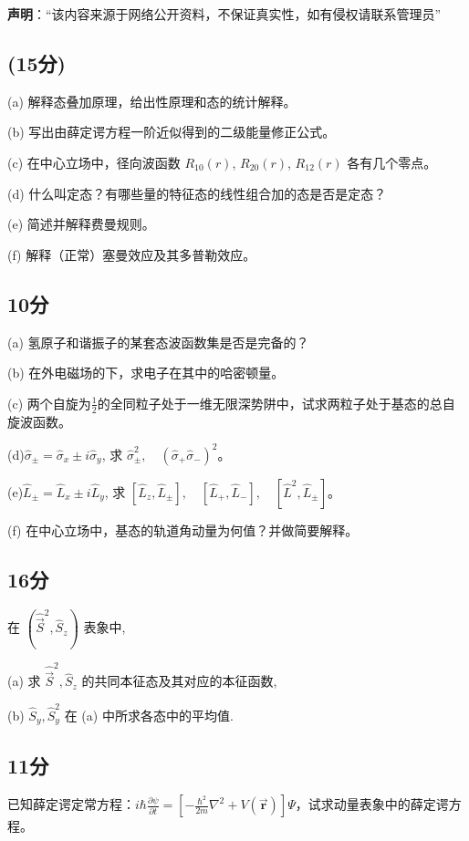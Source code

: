 
\textbf{声明}：“该内容来源于网络公开资料，不保证真实性，如有侵权请联系管理员”



\subsection{(15分)}

(a) 解释态叠加原理，给出性原理和态的统计解释。

(b) 写出由薛定谔方程一阶近似得到的二级能量修正公式。

(c) 在中心立场中，径向波函数 $R_{10}(r)$, $R_{20}(r)$, $R_{12}(r)$ 各有几个零点。

(d) 什么叫定态？有哪些量的特征态的线性组合加的态是否是定态？

(e) 简述并解释费曼规则。

(f) 解释（正常）塞曼效应及其多普勒效应。

\subsection{10分}

(a) 氢原子和谐振子的某套态波函数集是否是完备的？

(b) 在外电磁场的下，求电子在其中的哈密顿量。

(c) 两个自旋为$\frac{1}{2}$的全同粒子处于一维无限深势阱中，试求两粒子处于基态的总自旋波函数。

(d)$\hat{\sigma}_{\pm} = \hat{\sigma}_x \pm i \hat{\sigma}_y
$, 求 $\hat{\sigma}_{\pm}^2,\quad (\hat{\sigma}_+ \hat{\sigma}_-)^2$。

(e)$\hat{L}_{\pm} = \hat{L}_x \pm i \hat{L}_y$,  求 $[\hat{L}_z, \hat{L}_\pm],\quad [\hat{L}_+,\hat{L}_-], \quad [\hat{L}^2, \hat{L}_\pm]$。

(f) 在中心立场中，基态的轨道角动量为何值？并做简要解释。


\subsection{16分}
在 $(\hat{\vec S}^2, \hat{S}_z)$ 表象中,

(a) 求 $\hat{\vec S}^2, \hat{S}_z$ 的共同本征态及其对应的本征函数,

(b) $\hat{S}_y, \hat{S}_y^2$ 在 (a) 中所求各态中的平均值.

\subsection{11分}
已知薛定谔定常方程：$i\hbar \frac{\partial \psi}{\partial t} = \left[ -\frac{\hbar^2}{2m} \nabla^2 + V(\mathbf{\vec r}) \right] \Psi$，试求动量表象中的薛定谔方程。

